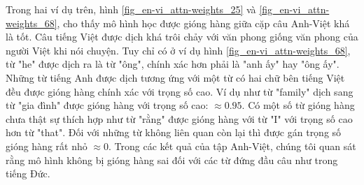Trong hai ví dụ trên, hình \ref{fig_en-vi_attn-weights_25} và \ref{fig_en-vi_attn-weights_68}, cho thấy mô hình học được gióng hàng giữa cặp câu Anh-Việt khá là tốt. Câu tiếng Việt được dịch khá trôi chảy với văn phong giống văn phong của người Việt khi nói chuyện. Tuy chỉ có ở ví dụ hình \ref{fig_en-vi_attn-weights_68}, từ "he" được dịch ra là từ "ông", chính xác hơn phải là "anh ấy" hay "ông ấy". Những từ tiếng Anh được dịch tương ứng với một từ có hai chữ bên tiếng Việt đều được gióng hàng chính xác với trọng số cao. Ví dụ như từ "family" dịch sang từ "gia đình" được gióng hàng với trọng số cao: $\approx 0.95$. Có một số từ gióng hàng chưa thật sự thích hợp như từ "rằng" được gióng hàng với từ "I" với trọng số cao hơn từ "that". Đối với những từ không liên quan còn lại thì được gán trọng số gióng hàng rất nhỏ $\approx 0$. Trong các kết quả của tập Anh-Việt, chúng tôi quan sát rằng mô hình không bị gióng hàng sai đối với các từ đứng đầu câu như trong tiếng Đức.
